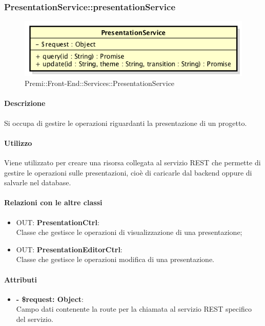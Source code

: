 		\subsubsection{PresentationService::presentationService}
		\begin{figure}[h]
			\centering
				\includegraphics[width=0.5\linewidth]{img/premi_front_end_services_presentationservice}
			\caption[Premi::Front-End::Services::PresentationService]{Premi::Front-End::Services::PresentationService}
		\end{figure}
		
		\paragraph{Descrizione}
		Si occupa di gestire le operazioni riguardanti la presentazione di un progetto.
		
		\paragraph{Utilizzo}
		Viene utilizzato per creare una risorsa collegata al servizio REST che permette di gestire le operazioni sulle presentazioni, cioè di caricarle dal backend oppure di salvarle nel database.
		
		\paragraph{Relazioni con le altre classi}
		\begin{itemize}
			\item OUT: \textbf{PresentationCtrl}:\\
			Classe che gestisce le operazioni di visualizzazione di una presentazione;
			\item OUT: \textbf{PresentationEditorCtrl}:\\
			Classe che gestisce le operazioni modifica di una presentazione.
		\end{itemize}
		
		\paragraph{Attributi}
		\begin{itemize}
			\item \textbf{- \$request: Object}:\\
			Campo dati contenente la route per la chiamata al servizio REST specifico del servizio.
		\end{itemize}	
		
